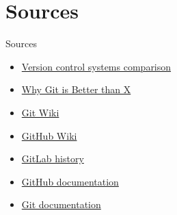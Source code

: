 \documentclass[usenames,dvipsnames,10pt,aspectratio=169]{beamer}
\begin{document}
\section{Sources}
\begin{frame}{Sources}
    \begin{itemize}
       \item \href{https://en.wikipedia.org/wiki/Comparison_of_version-control_software}{Version control systems comparison}
       \item \href{https://translatedby.com/you/why-git-is-better-than-x/original/}{Why Git is Better than X}
       \item \href{https://en.wikipedia.org/wiki/Git}{Git Wiki}
       \item \href{https://en.wikipedia.org/wiki/GitHub}{GitHub Wiki}
       \item \href{https://about.gitlab.com/company/history/}{GitLab history}
       \item \href{https://docs.github.com/en}{GitHub documentation}
       \item \href{https://git-scm.com/}{Git documentation}
    \end{itemize}
\end{frame}
\end{document}
